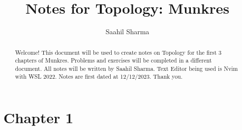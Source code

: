 \documentclass[a4paper]{report}
\title{Notes for Topology: Munkres}
\author{Saahil Sharma}
\begin{document}
\begin{titlingpage}
\maketitle
\begin{abstract}
	Welcome! This document will be used to create notes on Topology for the first 3 chapters of Munkres. Problems and exercises will be completed in a different document. All notes will be written by Saahil Sharma. Text Editor being used is Nvim with WSL 2022. Notes are first dated at 12/12/2023. Thank you.  
\end{abstract}
\end{titlingpage}
\section{Chapter 1}
\end{document}
